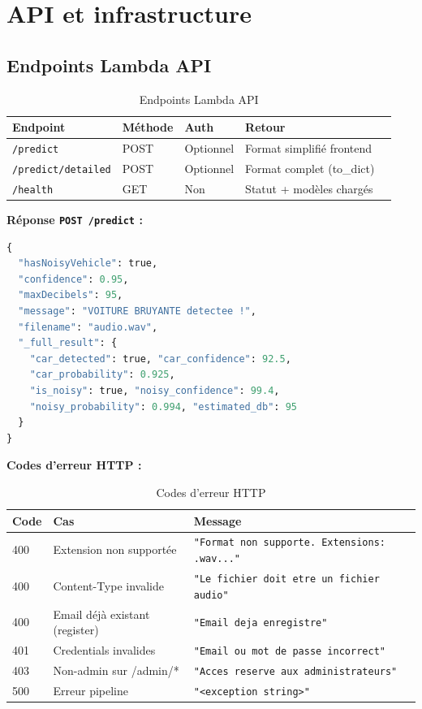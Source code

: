 \documentclass[11pt,a4paper]{article}
\newcommand{\code}[1]{\texttt{\small #1}}
\begin{document}
\section{API et infrastructure}

\subsection{Endpoints Lambda API}

\begin{table}[htbp]
\centering
\begin{tabular}{@{}lllll@{}}
\toprule
\textbf{Endpoint} & \textbf{Méthode} & \textbf{Auth} & \textbf{Retour} \\
\midrule
\code{/predict} & POST & Optionnel & Format simplifié frontend \\
\code{/predict/detailed} & POST & Optionnel & Format complet (to\_dict) \\
\code{/health} & GET & Non & Statut + modèles chargés \\
\bottomrule
\end{tabular}
\caption{Endpoints Lambda API}
\end{table}

\textbf{Réponse \code{POST /predict} :}
\begin{lstlisting}[language=Python,caption={Format de réponse simplifié}]
{
  "hasNoisyVehicle": true,
  "confidence": 0.95,
  "maxDecibels": 95,
  "message": "VOITURE BRUYANTE detectee !",
  "filename": "audio.wav",
  "_full_result": {
    "car_detected": true, "car_confidence": 92.5,
    "car_probability": 0.925,
    "is_noisy": true, "noisy_confidence": 99.4,
    "noisy_probability": 0.994, "estimated_db": 95
  }
}
\end{lstlisting}

\textbf{Codes d'erreur HTTP :}
\begin{table}[htbp]
\centering
\begin{tabular}{@{}lll@{}}
\toprule
\textbf{Code} & \textbf{Cas} & \textbf{Message} \\
\midrule
400 & Extension non supportée & \code{"Format non supporte. Extensions: .wav..."} \\
400 & Content-Type invalide & \code{"Le fichier doit etre un fichier audio"} \\
400 & Email déjà existant (register) & \code{"Email deja enregistre"} \\
401 & Credentials invalides & \code{"Email ou mot de passe incorrect"} \\
403 & Non-admin sur /admin/* & \code{"Acces reserve aux administrateurs"} \\
500 & Erreur pipeline & \code{"<exception string>"} \\
\bottomrule
\end{tabular}
\caption{Codes d'erreur HTTP}
\end{table}
\end{document}
